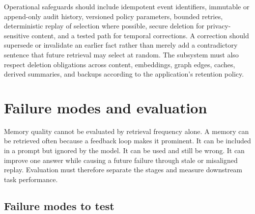 \EngineeringLabel{} Operational safeguards should include idempotent event identifiers, immutable or append-only audit history, versioned policy parameters, bounded retries, deterministic replay of selection where possible, secure deletion for privacy-sensitive content, and a tested path for temporal corrections. A correction should supersede or invalidate an earlier fact rather than merely add a contradictory sentence that future retrieval may select at random. The subsystem must also respect deletion obligations across content, embeddings, graph edges, caches, derived summaries, and backups according to the application's retention policy.

\section{Failure modes and evaluation}
\label{sec:ch12-evaluation}

Memory quality cannot be evaluated by retrieval frequency alone. A memory can be retrieved often because a feedback loop makes it prominent. It can be included in a prompt but ignored by the model. It can be used and still be wrong. It can improve one answer while causing a future failure through stale or misaligned replay. Evaluation must therefore separate the stages and measure downstream task performance.

\subsection{Failure modes to test}
\label{subsec:ch12-failure-modes}

